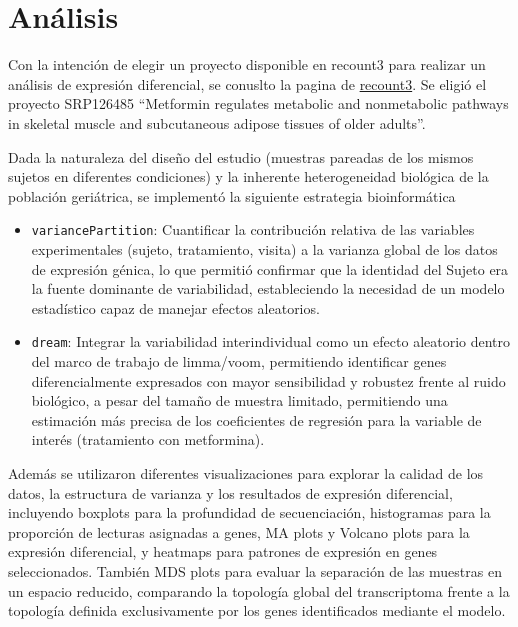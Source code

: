 \documentclass[
  spanish,
  11pt,
]{article}
\begin{document}
\section{Análisis}\label{anuxe1lisis}

Con la intención de elegir un proyecto disponible en recount3 para
realizar un análisis de expresión diferencial, se conuslto la pagina de
\href{https://rna.recount.bio/}{recount3}. Se eligió el proyecto
SRP126485 ``Metformin regulates metabolic and nonmetabolic pathways in
skeletal muscle and subcutaneous adipose tissues of older adults''.

Dada la naturaleza del diseño del estudio (muestras pareadas de los
mismos sujetos en diferentes condiciones) y la inherente heterogeneidad
biológica de la población geriátrica, se implementó la siguiente
estrategia bioinformática

\begin{itemize}
\item
  \texttt{variancePartition}: Cuantificar la contribución relativa de
  las variables experimentales (sujeto, tratamiento, visita) a la
  varianza global de los datos de expresión génica, lo que permitió
  confirmar que la identidad del Sujeto era la fuente dominante de
  variabilidad, estableciendo la necesidad de un modelo estadístico
  capaz de manejar efectos aleatorios.
\item
  \texttt{dream}: Integrar la variabilidad interindividual como un
  efecto aleatorio dentro del marco de trabajo de limma/voom,
  permitiendo identificar genes diferencialmente expresados con mayor
  sensibilidad y robustez frente al ruido biológico, a pesar del tamaño
  de muestra limitado, permitiendo una estimación más precisa de los
  coeficientes de regresión para la variable de interés (tratamiento con
  metformina).
\end{itemize}

Además se utilizaron diferentes visualizaciones para explorar la calidad
de los datos, la estructura de varianza y los resultados de expresión
diferencial, incluyendo boxplots para la profundidad de secuenciación,
histogramas para la proporción de lecturas asignadas a genes, MA plots y
Volcano plots para la expresión diferencial, y heatmaps para patrones de
expresión en genes seleccionados. También MDS plots para evaluar la
separación de las muestras en un espacio reducido, comparando la
topología global del transcriptoma frente a la topología definida
exclusivamente por los genes identificados mediante el modelo.
\end{document}
